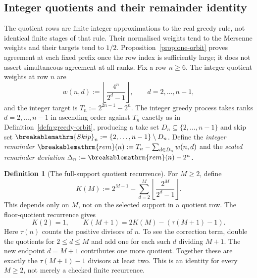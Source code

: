 \documentclass[11pt]{article}
\theoremstyle{plain}
\theoremstyle{definition}
\newtheorem{defn}[thm]{Definition}
\theoremstyle{remark}
\renewcommand{\mathrm}[1]{\ifmmode\breakablemathrm{#1}\else\textrm{#1}\fi}%
\begin{document}
\subsection{Integer quotients and their remainder identity}
\label{ssec:seam-model}

The quotient rows are finite integer approximations to the real
greedy rule, not identical finite stages of that rule.  Their
normalised weights tend to the Mersenne weights and their targets
tend to $1/2$.  Proposition~\ref{prop:one-orbit} proves agreement
at each fixed prefix once the row index is sufficiently large;
it does not assert simultaneous agreement at all ranks.
Fix a row $n\ge6$. The integer quotient weights at row $n$ are
\[
w(n,d) := \left\lfloor \frac{4^n}{2^d-1} \right\rfloor, \qquad d = 2,\dots,n-1,
\]
and the integer target is $T_n := 2^{2n-1} - 2^n$. The integer greedy process takes ranks $d = 2,\dots,n-1$
in ascending order against $T_n$ exactly as in Definition~\ref{defn:greedy-orbit}, producing a take
set $D_n \subseteq \{2,\dots,n-1\}$ and skip set
$\mathrm{Skip}_n := \{2,\dots,n-1\} \mathbin{\backslash} D_n$.
Define the \emph{integer remainder} $\mathrm{rem}(n) := T_n - \sum_{d \in D_n} w(n,d)$ and the
\emph{scaled remainder deviation} $\Delta_n := \mathrm{rem}(n) - 2^n$.

\begin{defn}[The full-support quotient recurrence]
For $M \ge 2$, define
\[
K(M) := 2^{M-1} - \sum_{d=2}^{M} \left\lfloor \frac{2^M}{2^d-1} \right\rfloor.
\]
This depends only on $M$, not on the selected support in a quotient
row.  The floor-quotient recurrence gives
\[
 K(2)=1,\qquad K(M+1)=2K(M)-(\tau(M+1)-1).
\]
Here $\tau(n)$ counts the positive divisors of $n$.  To see the correction term, double the quotients for $2\le d\le M$
and add one for each such $d$ dividing $M+1$.  The new endpoint
$d=M+1$ contributes one more quotient.  Together these are
exactly the $\tau(M+1)-1$ divisors at least two.
This is an identity for every $M\ge2$, not merely a checked
finite recurrence.
\end{defn}
\end{document}
